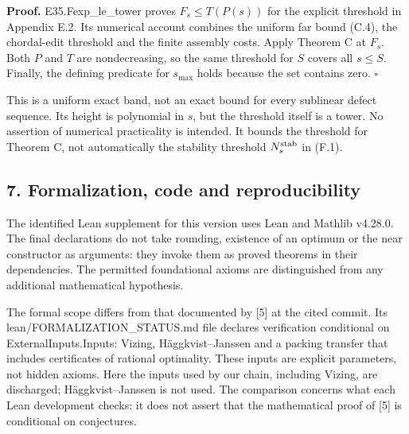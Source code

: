 \documentclass[english,11pt,a4paper]{article}
\begin{document}
\textbf{Proof.} {\ttfamily\small E35.\discretionary{\hbox{\ensuremath{\hookrightarrow}}}{}{}Fexp\_\discretionary{\hbox{\ensuremath{\hookrightarrow}}}{}{}le\_\discretionary{\hbox{\ensuremath{\hookrightarrow}}}{}{}tower} proves \(F_s\le T(P(s))\) for the explicit threshold in Appendix E.2. Its numerical account combines the uniform far bound (C.4), the chordal-edit threshold and the finite assembly costs. Apply Theorem C at \(F_s\). Both \(P\) and \(T\) are nondecreasing, so the same threshold for \(S\) covers all \(s\le S\). Finally, the defining predicate for \(s_{\max}\) holds because the set contains zero. \(\square\)

This is a uniform exact band, not an exact bound for every sublinear defect sequence. Its height is polynomial in \(s\), but the threshold itself is a tower. No assertion of numerical practicality is intended. It bounds the threshold for Theorem C, not automatically the stability threshold \(N_s^{\rm stab}\) in (F.1).

\subsection{7. Formalization, code and reproducibility}\label{formalization-code-and-reproducibility}

The identified Lean supplement for this version uses Lean and Mathlib v4.28.0. The final declarations do not take rounding, existence of an optimum or the near constructor as arguments: they invoke them as proved theorems in their dependencies. The permitted foundational axioms are distinguished from any additional mathematical hypothesis.

The formal scope differs from that documented by {[}5{]} at the cited commit. Its {\ttfamily\small lean/\discretionary{\hbox{\ensuremath{\hookrightarrow}}}{}{}FORMALIZATIO\discretionary{\hbox{\ensuremath{\hookrightarrow}}}{}{}N\_\discretionary{\hbox{\ensuremath{\hookrightarrow}}}{}{}STATUS.\discretionary{\hbox{\ensuremath{\hookrightarrow}}}{}{}md} file declares verification conditional on {\ttfamily\small ExternalInpu\discretionary{\hbox{\ensuremath{\hookrightarrow}}}{}{}ts.\discretionary{\hbox{\ensuremath{\hookrightarrow}}}{}{}Inputs}: Vizing, Häggkvist--Janssen and a packing transfer that includes certificates of rational optimality. These inputs are explicit parameters, not hidden axioms. Here the inputs used by our chain, including Vizing, are discharged; Häggkvist--Janssen is not used. The comparison concerns what each Lean development checks: it does not assert that the mathematical proof of {[}5{]} is conditional on conjectures.
\end{document}
